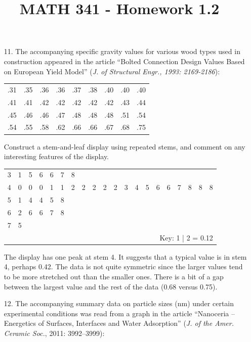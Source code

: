 \documentclass[letterpaper,12pt]{article}
\author{}
\title{MATH 341 - Homework 1.2}
\date{} %
\begin{document}
\maketitle

\begin{enumerate}
  \item[11.]
    The accompanying specific gravity values for various wood types used in construction appeared in the article ``Bolted Connection Design Values Based on European Yield Model'' (\textit{J. of Structural Engr., 1993: 2169-2186}):
    \begin{center}
      \begin{tabular}{l l l l l l l l l}
        .31 & .35 & .36 & .36 & .37 & .38 & .40 & .40 & .40 \\
        .41 & .41 & .42 & .42 & .42 & .42 & .42 & .43 & .44 \\
        .45 & .46 & .46 & .47 & .48 & .48 & .48 & .51 & .54 \\
        .54 & .55 & .58 & .62 & .66 & .66 & .67 & .68 & .75
      \end{tabular}
    \end{center}
    Construct a stem-and-leaf display using repeated stems, and comment on any interesting features of the display.
    \begin{center}
      \begin{tabular}{c | c c c c c c c c c c c c c c c c c c c}
        3 & 1 & 5 & 6 & 6 & 7 & 8 \\
        4 & 0 & 0 & 0 & 1 & 1 & 2 & 2 & 2 & 2 & 2 & 3 & 4 & 5 & 6 & 6 & 7 & 8 & 8 & 8 \\
        5 & 1 & 4 & 4 & 5 & 8 \\
        6 & 2 & 6 & 6 & 7 & 8\\
        7 & 5 \\
        \multicolumn{20}{r}{Key: 1 | 2 = 0.12}
      \end{tabular}
    \end{center}
    The display has one peak at stem 4. It suggests that a typical value is in stem 4, perhaps 0.42. The data is not quite symmetric since the larger values tend to be more stretched out than the smaller ones. There is a bit of a gap between the largest value and the rest of the data (0.68 versus 0.75).
  \item[12.]
    The accompanying summary data on  particle sizes (nm) under certain experimental conditions was read from a graph in the article ``Nanoceria – Energetics of Surfaces, Interfaces and Water Adsorption'' (\textit{J. of the Amer. Ceramic Soc.}, 2011: 3992–3999):

\end{enumerate}
\end{document}
